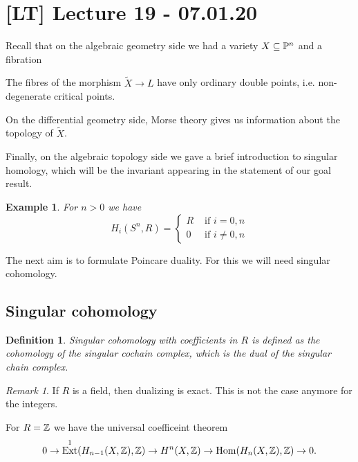 \documentclass[A4paper, british]{amsart}
\theoremstyle{darkgreentheorem}
\theoremstyle{darkbluedefinition}
\newtheorem{defn}[thm]{Definition}
\theoremstyle{darkredexample}
\newtheorem{exa}[thm]{Example}
\theoremstyle{remark}
\newtheorem{rem}[thm]{Remark}
\DeclareMathOperator{\Hom}{Hom}
\DeclareMathOperator{\Ext}{Ext}
\newcommand{\1}{\mathbbm{1}}
\newcommand{\dual}{^{\vee}}
\newcommand{\tms}{\times}
\newcommand{\sub}{\subseteq}
\begin{document}
\section{[LT] Lecture 19 - 07.01.20}

Recall that on the algebraic geometry side we had a variety $X\sub \P^{n}$ and a fibration
\begin{center}
\end{center}

The fibres of the morphism $\tilde{X}\to L$ have only ordinary double points, i.e. non-degenerate critical points.

On the differential geometry side, Morse theory gives us information about the topology of $\tilde{X}$.

Finally, on the algebraic topology side we gave a brief introduction to singular homology, which will be the invariant appearing in the statement of our goal result.

\begin{exa}
    For $n>0$ we have
    \[ H_{i}(S^{n},R)=\begin{cases}
	R & \text{ if } i=0,n\\
	0 & \text{ if } i\neq 0,n
    \end{cases}
    \]
\end{exa}

The next aim is to formulate Poincare duality.
For this we will need singular cohomology.

\subsection{Singular cohomology}

\begin{defn}
    \textit{Singular cohomology} with coefficients in $R$ is defined as the cohomology of the singular cochain complex, which is the dual of the singular chain complex.
\end{defn}

\begin{rem}
    If $R$ is a field, then dualizing is exact.
    This is not the case anymore for the integers.
\end{rem}

For $R=\mathbb{Z}$ we have the universal coefficeint theorem
\[ 0\to \Ext^{1}(H_{n-1}(X,\Z),\Z)\to H^{n}(X,\Z)\to \Hom(H_{n}(X,\Z),\Z)\to 0 .\]
\end{document}
